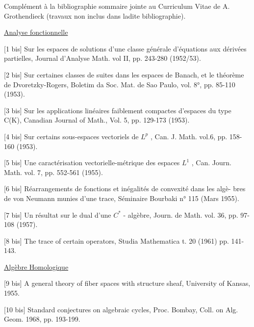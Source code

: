 
Complément à la bibliographie sommaire jointe au Curriculum Vitae de
A. Grothendieck (travaux non inclus dans ladite bibliographie).

\uline{Analyse fonctionnelle}

[1 bis] Sur les espaces de solutions d'une classe générale d'équations aux
dérivées partielles, Journal d'Analyse Math. vol II, pp. 243-280
(1952/53).

[2 bis] Sur certaines classes de suites dans les espaces de Banach, et le
théorème de Dvoretzky-Rogers, Boletim da Soc. Mat. de Sao Paulo, vol.
8°, pp. 85-110 (1953).

[3 bis] Sur les applications linéaires faiblement compactes d'espaces du type
C(K), Canadian Journal of Math., Vol. 5, pp. 129-173 (1953).

[4 bis] Sur certains sous-espaces vectoriels de $L^p$ , Can. J. Math. vol.6,
pp. 158-160 (1953).

[5 bis] Une caractérisation vectorielle-métrique des espaces $L^1$ , Can. Journ.
Math. vol. 7, pp. 552-561 (1955).

[6 bis] Réarrangements de fonctions et inégalités de convexité dans les algè-%
bres de von Neumann munies d'une trace, Séminaire Bourbaki n° 115
(Mars 1955).

[7 bis] Un résultat sur le dual d'une $C^*$ - algèbre, Journ. de Math. vol. 36,
pp. 97-108 (1957).

[8 bis] The trace of certain operators, Studia Mathematica t. 20 (1961)
pp. 141-143.

\uline{Algèbre Homologique}

[9 bis] A general theory of fiber spaces with structure sheaf, University of
Kansas, 1955.

[10 bis] Standard conjectures on algebraic cycles, Proc. Bombay, Coll. on Alg.
Geom. 1968, pp. 193-199.


